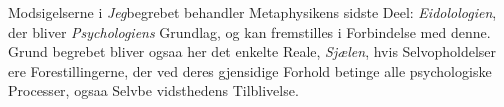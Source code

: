 \documentclass[12pt,a4paper]{book}
\begin{document}
Modsigelserne i \emph{Jeg}begrebet behandler Metaphysikens
sidste Deel: \emph{Eidolologien}, der bliver \emph{Psychologiens}
Grundlag, og kan fremstilles i Forbindelse med denne. Grund\-%
begrebet bliver ogsaa her det enkelte Reale, \emph{Sjælen}, hvis
Selvopholdelser ere Forestillingerne, der ved deres gjensidige
Forhold betinge alle psychologiske Processer, ogsaa Selvbe\-%
vidsthedens Tilblivelse.
\end{document}
